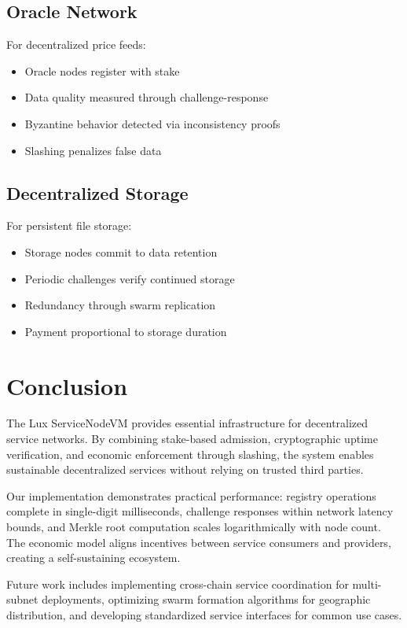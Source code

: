 \documentclass[11pt,a4paper]{article}
\begin{document}
\subsection{Oracle Network}

For decentralized price feeds:
\begin{itemize}
    \item Oracle nodes register with stake
    \item Data quality measured through challenge-response
    \item Byzantine behavior detected via inconsistency proofs
    \item Slashing penalizes false data
\end{itemize}

\subsection{Decentralized Storage}

For persistent file storage:
\begin{itemize}
    \item Storage nodes commit to data retention
    \item Periodic challenges verify continued storage
    \item Redundancy through swarm replication
    \item Payment proportional to storage duration
\end{itemize}

\section{Conclusion}

The Lux ServiceNodeVM provides essential infrastructure for decentralized service networks. By combining stake-based admission, cryptographic uptime verification, and economic enforcement through slashing, the system enables sustainable decentralized services without relying on trusted third parties.

Our implementation demonstrates practical performance: registry operations complete in single-digit milliseconds, challenge responses within network latency bounds, and Merkle root computation scales logarithmically with node count. The economic model aligns incentives between service consumers and providers, creating a self-sustaining ecosystem.

Future work includes implementing cross-chain service coordination for multi-subnet deployments, optimizing swarm formation algorithms for geographic distribution, and developing standardized service interfaces for common use cases.
\end{document}
